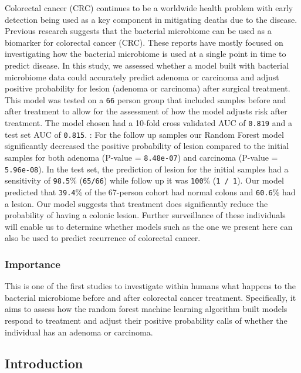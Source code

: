 \documentclass[12pt,]{article}
\begin{document}
Colorectal cancer (CRC) continues to be a worldwide health problem with
early detection being used as a key component in mitigating deaths due
to the disease. Previous research suggests that the bacterial microbiome
can be used as a biomarker for colorectal cancer (CRC). These reports
have mostly focused on investigating how the bacterial microbiome is
used at a single point in time to predict disease. In this study, we
assessed whether a model built with bacterial microbiome data could
accurately predict adenoma or carcinoma and adjust positive probability
for lesion (adenoma or carcinoma) after surgical treatment. This model
was tested on a \texttt{66} person group that included samples before
and after treatment to allow for the assessment of how the model adjusts
risk after treatment. The model chosen had a 10-fold cross validated AUC
of \texttt{0.819} and a test set AUC of \texttt{0.815}. : For the follow
up samples our Random Forest model significantly decreased the positive
probability of lesion compared to the initial samples for both adenoma
(P-value = \texttt{8.48e-07}) and carcinoma (P-value =
\texttt{5.96e-08}). In the test set, the prediction of lesion for the
initial samples had a sensitivity of \texttt{98.5}\% (\texttt{65/66})
while follow up it was \texttt{100}\% (\texttt{1\ /\ 1}). Our model
predicted that \texttt{39.4}\% of the 67-person cohort had normal colons
and \texttt{60.6}\% had a lesion. Our model suggests that treatment does
significantly reduce the probability of having a colonic lesion. Further
surveillance of these individuals will enable us to determine whether
models such as the one we present here can also be used to predict
recurrence of colorectal cancer.

\newpage

\subsubsection{Importance}\label{importance}

This is one of the first studies to investigate within humans what
happens to the bacterial microbiome before and after colorectal cancer
treatment. Specifically, it aims to assess how the random forest machine
learning algorithm built models respond to treatment and adjust their
positive probability calls of whether the individual has an adenoma or
carcinoma.

\newpage

\subsection{Introduction}\label{introduction}
\end{document}
